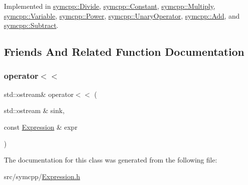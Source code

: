 Implemented in \mbox{\hyperlink{classsymcpp_1_1Divide_a85dcd571e1d2a188dcdc8090b7e90074}{symcpp\+::\+Divide}}, \mbox{\hyperlink{classsymcpp_1_1Constant_ac6f62c3945429d0d318dc7d366dd4b54}{symcpp\+::\+Constant}}, \mbox{\hyperlink{classsymcpp_1_1Multiply_a83a9396b931cd5010630f48ecd1bc2a1}{symcpp\+::\+Multiply}}, \mbox{\hyperlink{classsymcpp_1_1Variable_a1dfbef67a237aa2533d8dc88c378d08b}{symcpp\+::\+Variable}}, \mbox{\hyperlink{classsymcpp_1_1Power_a0cf64595eca511f6a83317f47754bd58}{symcpp\+::\+Power}}, \mbox{\hyperlink{classsymcpp_1_1UnaryOperator_aa2296c73f9ca24a739fb8c3ff246fe0e}{symcpp\+::\+Unary\+Operator}}, \mbox{\hyperlink{classsymcpp_1_1Add_a79d0aa670728ba4a257e777ed4ac1ec0}{symcpp\+::\+Add}}, and \mbox{\hyperlink{classsymcpp_1_1Subtract_a35a24632dfacadb23e4177a539e7c1df}{symcpp\+::\+Subtract}}.



\subsection{Friends And Related Function Documentation}
\mbox{\label{classsymcpp_1_1Expression_ade0d81d94acc2274ae8657f14d5636fe}} 
\subsubsection{\texorpdfstring{operator$<$$<$}{operator<<}}
{\footnotesize\ttfamily std\+::ostream\& operator$<$$<$ (\begin{DoxyParamCaption}\item[{std\+::ostream \&}]{sink,  }\item[{const \mbox{\hyperlink{classsymcpp_1_1Expression}{Expression}} \&}]{expr }\end{DoxyParamCaption})\hspace{0.3cm}{\ttfamily [friend]}}



The documentation for this class was generated from the following file\+:\begin{DoxyCompactItemize}
\item 
src/symcpp/\mbox{\hyperlink{Expression_8h}{Expression.\+h}}\end{DoxyCompactItemize}
